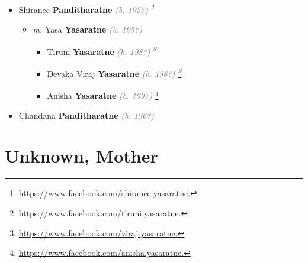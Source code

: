 \documentclass[10pt, openany]{book}
\begin{document}
\begin{itemize}
{\begin{itemize}
{\begin{itemize}
{\begin{itemize}
{\begin{itemize}
{ }
\item{Shiranee \textbf{Panditharatne} \textcolor{gray}{\textit{(b. 195?)}} \textcolor{slmaroon}{\textit{\footnote{\url{https://www.facebook.com/shiranee.yasaratne.}}}}
\begin{itemize}
\item{\textit{m.} Yasa \textbf{Yasaratne} \textcolor{gray}{\textit{(b. 195?)}}   \label{couple:00003712:00003716} \begin{itemize}
\item{Tiruni \textbf{Yasaratne} \textcolor{gray}{\textit{(b. 198?)}} \textcolor{slmaroon}{\textit{\footnote{\url{https://www.facebook.com/tiruni.yasaratne.}}}}
 }
\item{Devaka Viraj \textbf{Yasaratne} \textcolor{gray}{\textit{(b. 198?)}} \textcolor{slmaroon}{\textit{\footnote{\url{https://www.facebook.com/viraj.yasaratne.}}}}
  }
\item{Anisha \textbf{Yasaratne} \textcolor{gray}{\textit{(b. 199?)}} \textcolor{slmaroon}{\textit{\footnote{\url{https://www.facebook.com/anisha.yasaratne.}}}}
 }
\end{itemize}}
\end{itemize}
 }
\item{Chandana \textbf{Panditharatne} \textcolor{gray}{\textit{(b. 196?)}}
 }
\end{itemize}}
\end{itemize}
  }
\end{itemize}}
\end{itemize}
 }
\end{itemize}
   
\part{Unknown, Mother}
\end{document}

